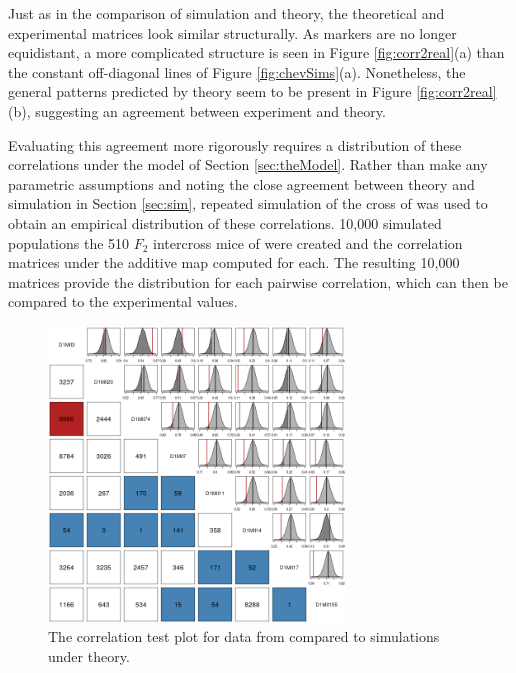 \documentclass{article}
\begin{document}
Just as in the comparison of simulation and theory, the theoretical and experimental matrices look similar structurally. As markers are no longer equidistant, a more complicated structure is seen in Figure \ref{fig:corr2real}(a) than the constant off-diagonal lines of Figure \ref{fig:chevSims}(a). Nonetheless, the general patterns predicted by theory seem to be present in Figure \ref{fig:corr2real}(b), suggesting an agreement between experiment and theory.

Evaluating this agreement more rigorously requires a distribution of these correlations under the model of Section \ref{sec:theModel}. Rather than make any parametric assumptions and noting the close agreement between theory and simulation in Section \ref{sec:sim}, repeated simulation of the cross of \cite{cheverudetal2001} was used to obtain an empirical distribution of these correlations. 10,000 simulated populations the 510 $F_2$ intercross mice of \cite{cheverudetal2001} were created and the correlation matrices under the additive map computed for each. The resulting 10,000 matrices provide the distribution for each pairwise correlation, which can then be compared to the experimental values.

\begin{figure}[htp]
  \begin{center}
      \includegraphics[width = 0.7\textwidth]{./img/chevCorrTest.png}
  \end{center}
  \caption{The correlation test plot for data from \cite{cheverudetal2001} compared to simulations under theory.}
  \label{fig:corrTestPlot}
\end{figure}
\end{document}
